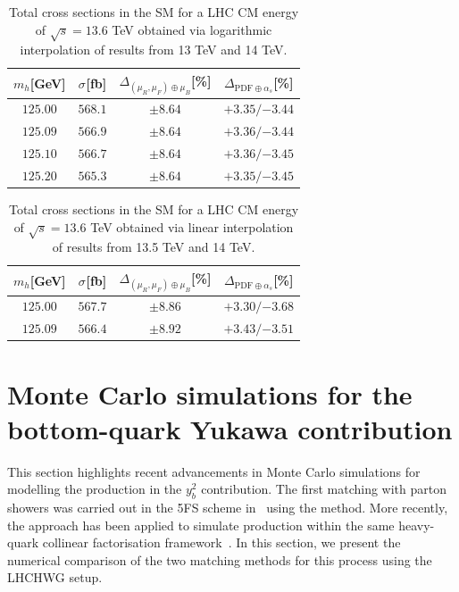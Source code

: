 \documentclass[11pt,a4paper]{article}
\begin{document}
\begin{table}[ht!]
\begin{center}%
\begin{small}%
\begin{tabular}{cccc}%
$m_h$[GeV] & $\sigma^{}$[fb] & $\Delta_{\left(\mu_{R},\mu_{F}\right)\oplus\mu_{B}}$[\%] & $\Delta_{\mathrm{PDF}\oplus\alpha_s}$[\%]  \\\hline
$125.00$ & $568.1$ & $\pm8.64$ & ${{+3.35}}/{-3.44}$ \\
$125.09$ & $566.9$ & $\pm8.64$ & ${{+3.36}}/{-3.44}$ \\
$125.10$ & $566.7$ & $\pm8.64$ & ${{+3.36}}/{-3.45}$ \\
$125.20$ & $565.3$ & $\pm8.64$ & ${{+3.35}}/{-3.45}$ 
\end{tabular}%
\end{small}%
\end{center}%
\caption{Total \bbH{} cross sections in the SM for a LHC CM energy of $\sqrt{s}=13.6$ TeV obtained via logarithmic interpolation of results from 13 TeV and 14 TeV.}
\label{tab:bbH136log}
\end{table}

\begin{table}[ht!]
\begin{center}%
\begin{small}%
\begin{tabular}{cccc}%
$m_h$[GeV] & $\sigma^{}$[fb] & $\Delta_{\left(\mu_{R},\mu_{F}\right)\oplus\mu_{B}}$[\%] & $\Delta_{\mathrm{PDF}\oplus\alpha_s}$[\%]  \\\hline
$125.00$ & $567.7$ & $\pm8.86$ & ${{+3.30}}/{-3.68}$ \\
$125.09$ & $566.4$ & $\pm8.92$ & ${{+3.43}}/{-3.51}$ 
\end{tabular}%
\end{small}%
\end{center}%
\caption{Total \bbH{} cross sections in the SM for a LHC CM energy of $\sqrt{s}=13.6$ TeV obtained via linear interpolation of results from 13.5 TeV and 14 TeV.}
\label{tab:bbH136linalt}
\end{table}

\section{Monte Carlo simulations for the bottom-quark Yukawa contribution}\label{sec:MCyb}
This section highlights recent advancements in Monte Carlo simulations for modelling the \bbH{} production in the $y_b^2$ contribution. The first matching with parton showers was carried out in the 5FS scheme in~ using the \minnlo{} method. More recently, the \GENEVA{} approach has been applied to simulate \bbtoH{} production within the same heavy-quark collinear factorisation framework~\cite{Gavardi:2025zpf}. In this section, we present the numerical comparison of the two matching methods for this process using the LHCHWG setup.
\end{document}

